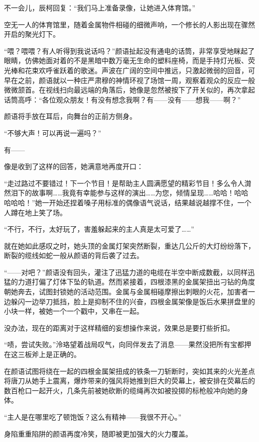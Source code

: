 \documentclass[UTF8, scheme = chinese, openany]{ctexbook}
\begin{document}
不一会儿，辰柯回复：“我们马上准备录像，让她进入体育馆。”

\vspace{1.5em}


空无一人的体育馆里，随着金属物件相碰的细微声响，一个修长的人影出现在骤然开启的聚光灯下。

“喂？喂喂？有人听得到我说话吗？”颜语扯起没有通电的话筒，非常享受地眯起了眼睛，仿佛她面对着的不是黑暗中数万毫无生命的塑料座椅，而是手持灯光板、荧光棒和花束欢呼雀跃着的歌迷。声波在广阔的空间中推远，只激起微弱的回音，可早在之前，颜语就以一种庄严肃穆的神情环视了场馆一周，观察着观众的反应一般微微颔首。在视线扫向最远端的角落后，她像是忽然被按下了开关似的，再次拿起话筒高呼：“各位观众朋友！有没有想念我啊？有——没有——想我——啊？”

颜语将手放在耳后，向舞台的正前方侧身。

“不够大声！可以再说一遍吗？”

有——

像是收到了这样的回答，她满意地再度开口：

“走过路过不要错过！下一个节目！是帮助主人圆满愿望的精彩节目！多么令人潸然泪下的故事啊……我竟有幸能参与这样的演出……为您，倾情呈现……哈哈！哈哈哈哈哈！”她一开始还捏着嗓子用标准的偶像语气说话，结果越说越撑不住，一个人蹲在地上笑了场。

“不行，不行，太好玩了，害羞躲起来的主人真是太可爱了……”

就在她如此感叹之时，她头顶的金属灯架突然断裂，重达几公斤的大灯纷纷落下，断裂的缆线如蛇一般从颜语的背后袭了过去。

“——对吧？”颜语没有回头，灌注了迅猛力道的电缆在半空中断成数截，以同样迅猛的力道打偏了灯体下坠的轨道。然而紧接着，四根漆黑的金属架扭出刁钻的角度朝她奔去，试图封锁她的活动范围。金属与金属相碰摩擦出刺眼的火花，加害者一边躲闪一边举刀抵挡，脸上是抑制不住的兴奋，四根金属架像是饭后水果拼盘里的小块一样，被她一个一个戳中，又串在一起。

没办法，现在的距离对于这样精细的妄想操作来说，效果总是要打些折扣。

“啧，尝试失败。”泠珞望着战局叹气，向同伴发去了消息——果然没把所有宝都押在这三板斧上是正确的。

在颜语试图将绕在一起的四根金属架扭成的铁条一刀斩断时，突如其来的火光差点将唐刀从她手上震离，爆炸带来的强风将她推到巨大的荧幕上，被安排在荧幕后的数百枪口一起开火，几条先前被她砍断的缆绳再次如被投掷的标枪般冲向她的身体。

“主人是在哪里吃了顿饱饭？这么有精神——我很不开心。”

身陷重重陷阱的颜语再度冷笑，随即被更加强大的火力覆盖。
\end{document}
